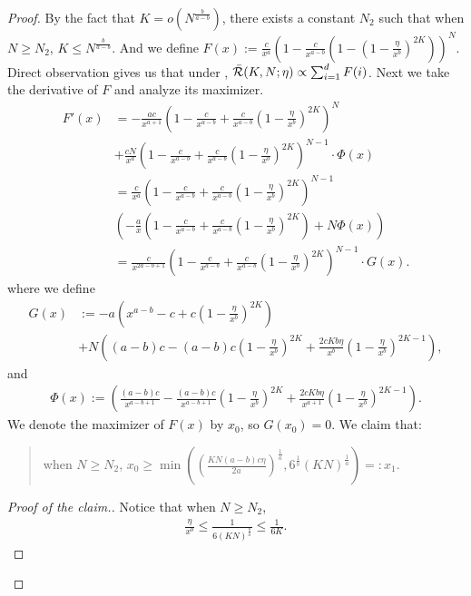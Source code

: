 \begin{proof}
By the fact that $K = o(N^{\frac{b}{a-b}})$, there exists a constant $N_2$ such that when $N \geq N_2$, $K\leq N^{\frac{b}{a-b}}$.
And we define $F(x) := \frac{c}{x^{a}}\left(1-\frac{c}{x^{a-b}}\left(1-\left(1-\frac{\eta}{x^b}\right)^{2K}\right)\right)^N$. Direct observation gives us that under , $\Bar{\mathcal{R}}(K, N;\eta) \propto \sum_{i=1}^d F(i)$. Next we take the derivative of $F$ and analyze its maximizer.
\begin{align*}
    F'(x) &= -\frac{ac}{x^{a+1}}\left(1-\frac{c}{x^{a-b}}+\frac{c}{x^{a-b}}\left(1-\frac{\eta}{x^b}\right)^{2K}\right)^N \\
    &+\frac{cN}{x^{a}}\left(1-\frac{c}{x^{a-b}}+\frac{c}{x^{a-b}}\left(1-\frac{\eta}{x^b}\right)^{2K}\right)^{N-1} \cdot \Phi(x) \\
    &=\frac{c}{x^{a}}\left(1-\frac{c}{x^{a-b}}+\frac{c}{x^{a-b}}\left(1-\frac{\eta}{x^b}\right)^{2K}\right)^{N-1} \\
    &\left(-\frac{a}{x}\left(1-\frac{c}{x^{a-b}}+\frac{c}{x^{a-b}}\left(1-\frac{\eta}{x^b}\right)^{2K}\right)+N\Phi(x)\right) \\
    &=\frac{c}{x^{2a-b+1}}\left(1-\frac{c}{x^{a-b}}+\frac{c}{x^{a-b}}\left(1-\frac{\eta}{x^b}\right)^{2K}\right)^{N-1}\cdot G(x).
\end{align*}
where we define 
\begin{align*}
    G(x) &:= -a\left(x^{a-b}-c+c\left(1-\frac{\eta}{x^b}\right)^{2K}\right) \\
    &+N\left((a-b)c-(a-b)c\left(1-\frac{\eta}{x^b}\right)^{2K}+\frac{2cKb\eta}{x^b}\left(1-\frac{\eta}{x^b}\right)^{2K-1}\right),
\end{align*}
and
\begin{align*}
    \Phi(x):=\left(\frac{(a-b)c}{x^{a-b+1}}-\frac{(a-b)c}{x^{a-b+1}}\left(1-\frac{\eta}{x^b}\right)^{2K}+\frac{2cKb\eta}{x^{a+1}}\left(1-\frac{\eta}{x^b}\right)^{2K-1}\right).
\end{align*}
We denote the maximizer of $F(x)$ by $x_0$, so $G(x_0) = 0$. We claim that:
\begin{quote}
    when $N\geq N_2$, $x_0\geq \min\left(\left(\frac{KN(a-b)c\eta}{2a}\right)^{\frac{1}{a}}, 6^{\frac{1}{b}}(KN)^{\frac{1}{a}}\right)=:x_1$.
\end{quote}
\begin{proof}[Proof of the claim.]
    Notice that when $N\geq N_2$, 
    \begin{align*}
        \frac{\eta}{x^b}\leq \frac{1}{6(KN)^{\frac{b}{a}}}\leq \frac{1}{6K}.

\end{align*}
\end{proof}
\end{proof}
